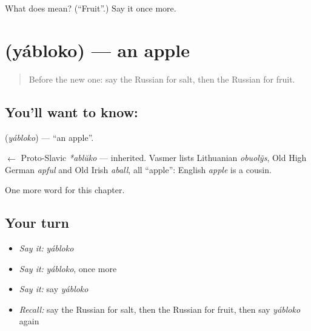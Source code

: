 \begin{tcolorbox}[breakable,colback=teal!4,colframe=teal!35!black,title={Before you move on}]
What does  mean? (\textquotedblleft{}Fruit\textquotedblright{}.) Say it once more.
\end{tcolorbox}
\section[\texorpdfstring{\ru{яблоко} (yábloko)}{яблоко (yábloko)}]{ (yábloko) — an apple}

\label{lesson:RU-C44-apple}



\begin{quote}
Before the new one: say the Russian for salt, then the Russian for fruit.
\end{quote}

\subsection*{You'll want to know: }
\textbf{} (\emph{yábloko}) — \textquotedblleft{}an apple\textquotedblright{}.

\begin{cousinweb}
\textbf{} $\leftarrow$ Proto-Slavic \emph{*ablŭko} — inherited. Vasmer lists Lithuanian \emph{obuolỹs}, Old High German \emph{apful} and Old Irish \emph{aball}, all \textquotedblleft{}apple\textquotedblright{}: English \emph{apple} is a cousin.
\end{cousinweb}

\begin{grammarlens}[title={What you've built}]
One more word for this chapter.
\end{grammarlens}

\subsection*{Your turn}
\begin{itemize}
\raggedright
  \item \emph{Say it:} \emph{yábloko}
  \item \emph{Say it:} \emph{yábloko}, once more
  \item \emph{Say it:} say \emph{yábloko}
  \item \emph{Recall:} say the Russian for salt, then the Russian for fruit, then say \emph{yábloko} again
\end{itemize}

